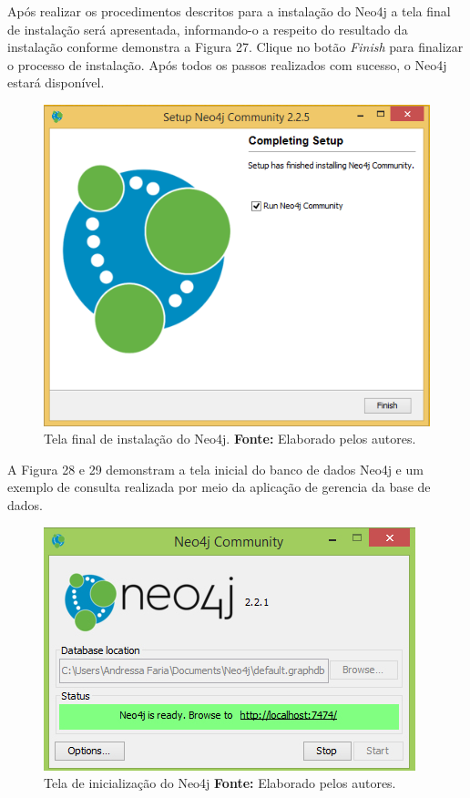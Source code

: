 \par Após realizar os procedimentos descritos para a instalação do Neo4j a tela final de instalação será apresentada, informando-o a respeito do resultado da instalação conforme demonstra a Figura 27. Clique no botão \textit{Finish} para finalizar o processo de instalação.
Após todos os passos realizados com sucesso, o Neo4j estará disponível.

\begin{figure}[h!]
	\centerline{\includegraphics[scale=0.4]{./imagens/neo4j-install-step5.png}}
	\caption[Tela final de instalação do Neo4j]
	{Tela final de instalação do Neo4j. \textbf{Fonte:} Elaborado pelos autores.}
	\label{fig:exemplo1}
\end{figure}

\par A Figura 28 e 29 demonstram a tela inicial do banco de dados Neo4j e um exemplo de consulta realizada por meio da aplicação de gerencia da base de dados.

\begin{figure}[h!]
	\centerline{\includegraphics[scale=0.60]{./imagens/neo4j.jpg}}
	\caption[Tela de inicialização do Neo4j ]
	{Tela de inicialização do Neo4j \textbf{Fonte:} Elaborado pelos autores.}
	\label{fig:exemplo1}
\end{figure}

